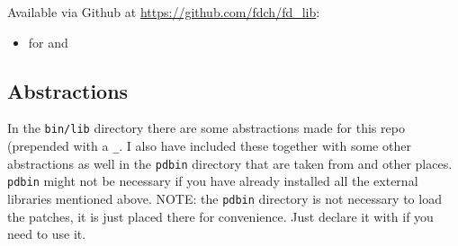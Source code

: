 Available via Github at \url{https://github.com/fdch/fd_lib}:

\begin{itemize}
  \singlespacing
\tightlist
\item
   for  and 
\end{itemize}


\subsection{Abstractions}

In the \texttt{bin/lib} directory there are some abstractions made for this repo (prepended with a \texttt{\_}. I also have included these together with some other abstractions as well in the \texttt{pdbin} directory that are taken from  and other places. \texttt{pdbin} might not be necessary if you have already installed all the external libraries mentioned above. NOTE: the \texttt{pdbin} directory is not necessary to load the patches, it is just placed there for convenience. Just declare it with  if you need to use it.








    
    
    
    
    


